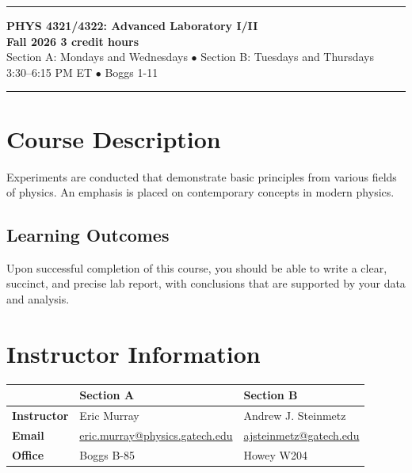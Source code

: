 \documentclass[11pt]{article}
\begin{document}
\noindent\textcolor{GTGold}{\rule{\textwidth}{4pt}}
\vspace{-0.2em}

\begingroup
\setlength{\fboxsep}{14pt}
\noindent\colorbox{GTLightGold}{%
\parbox{\dimexpr\textwidth-2\fboxsep\relax}{%
    {\LARGE\bfseries\textcolor{GTNavy}{PHYS 4321/4322: Advanced Laboratory I/II}}\\[0.45em]
    {\normalsize\bfseries Fall 2026 \textbar{} 3 credit hours}\\[0.15em]
    {\normalsize Section A: Mondays and Wednesdays $\bullet$ Section B: Tuesdays and Thursdays}\\[0.1em]
    {\normalsize 3:30--6:15 PM ET $\bullet$ Boggs 1-11}
}}
\endgroup

\vspace{0.1em}
\noindent\textcolor{GTLightGray}{\rule{\textwidth}{0.5pt}}


\section*{Course Description}

Experiments are conducted that demonstrate basic principles from various fields of physics. An emphasis is placed on contemporary concepts in modern physics.

\subsection*{Learning Outcomes}

Upon successful completion of this course, you should be able to write a clear, succinct, and precise lab report, with conclusions that are supported by your data and analysis.

\section*{Instructor Information}

\begin{tabularx}{\textwidth}{>{\bfseries}p{} X X}
\toprule
 & \textbf{Section A} & \textbf{Section B} \\
\midrule
Instructor & Eric Murray & Andrew J. Steinmetz \\
\midrule
Email & \href{mailto:eric.murray@physics.gatech.edu}{eric.murray@physics.gatech.edu} & \href{mailto:ajsteinmetz@gatech.edu}{ajsteinmetz@gatech.edu} \\
\midrule
Office & Boggs B-85 & Howey W204 \\
\bottomrule
\end{tabularx}
\end{document}
